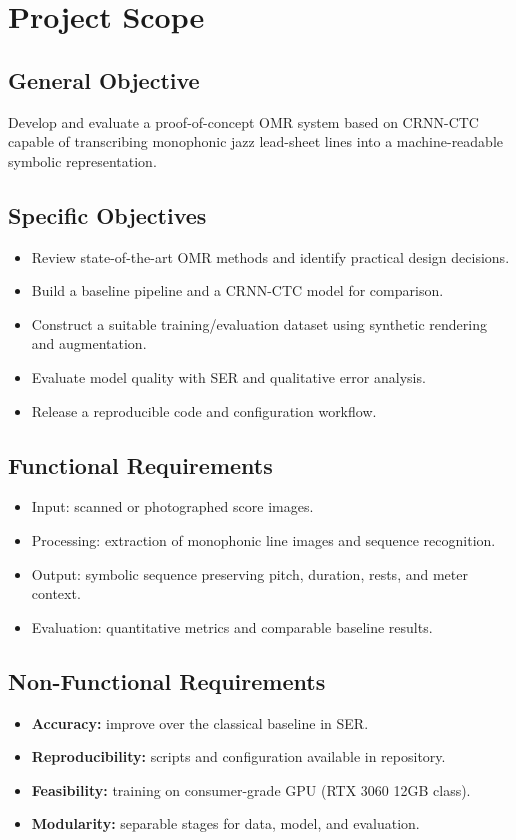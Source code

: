 \documentclass[11pt, a4paper]{article}
\begin{document}
\section{Project Scope}
\label{sec:scope}

\subsection{General Objective}
Develop and evaluate a proof-of-concept OMR system based on CRNN-CTC capable of transcribing monophonic jazz lead-sheet lines into a machine-readable symbolic representation.

\subsection{Specific Objectives}
\begin{itemize}
    \item Review state-of-the-art OMR methods and identify practical design decisions.
    \item Build a baseline pipeline and a CRNN-CTC model for comparison.
    \item Construct a suitable training/evaluation dataset using synthetic rendering and augmentation.
    \item Evaluate model quality with SER and qualitative error analysis.
    \item Release a reproducible code and configuration workflow.
\end{itemize}

\subsection{Functional Requirements}
\begin{itemize}
    \item Input: scanned or photographed score images.
    \item Processing: extraction of monophonic line images and sequence recognition.
    \item Output: symbolic sequence preserving pitch, duration, rests, and meter context.
    \item Evaluation: quantitative metrics and comparable baseline results.
\end{itemize}

\subsection{Non-Functional Requirements}
\begin{itemize}
    \item \textbf{Accuracy:} improve over the classical baseline in SER.
    \item \textbf{Reproducibility:} scripts and configuration available in repository.
    \item \textbf{Feasibility:} training on consumer-grade GPU (RTX 3060 12GB class).
    \item \textbf{Modularity:} separable stages for data, model, and evaluation.
\end{itemize}
\end{document}
